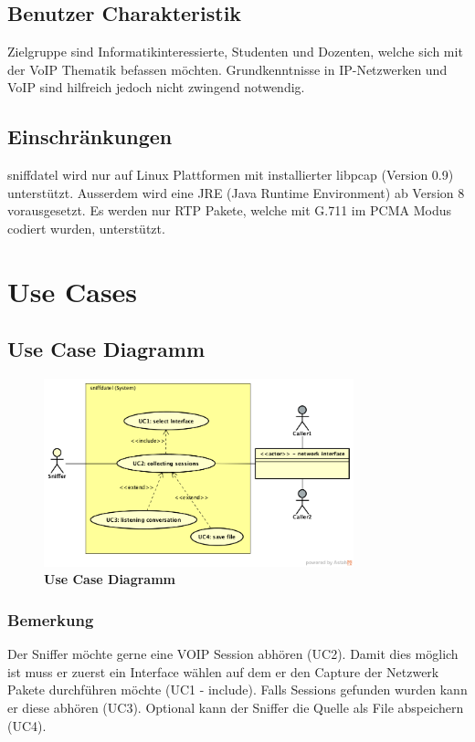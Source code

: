 \documentclass[a4,12pt]{scrartcl}
\begin{document}
\subsection{Benutzer Charakteristik}
Zielgruppe sind Informatikinteressierte, Studenten und Dozenten, welche sich mit der VoIP Thematik befassen möchten. Grundkenntnisse in IP-Netzwerken und VoIP sind hilfreich jedoch nicht zwingend notwendig. 
\subsection{Einschränkungen}
sniffdatel wird nur auf Linux Plattformen mit installierter libpcap (Version 0.9) unterstützt. Ausserdem wird eine JRE (Java Runtime Environment) ab Version 8 vorausgesetzt. Es werden nur RTP Pakete, welche mit G.711 im PCMA Modus codiert wurden, unterstützt.
\newpage
\section{Use Cases}
\subsection{Use Case Diagramm}
\begin{figure} [H]
	\begin{center}
	\includegraphics[width=0.80\textwidth]{./figures/UseCaseDiagramm.png}
	\caption{\textbf{Use Case Diagramm}}
	\label{Bild Referenz}
	\end{center}
\end{figure}

\subsubsection{Bemerkung}
Der Sniffer möchte gerne eine VOIP Session abhören (UC2). Damit dies möglich ist muss er zuerst ein Interface wählen auf dem er den Capture der Netzwerk Pakete durchführen möchte (UC1 - include). Falls Sessions gefunden wurden kann er diese abhören (UC3). Optional kann der Sniffer die Quelle als File abspeichern (UC4). 
\end{document}
